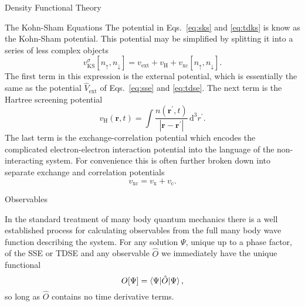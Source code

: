 \documentclass[letterpaper, 11 pt]{article}
\begin{document}
\begin{section}{Density Functional Theory \label{chap:dft}}
\begin{subsection}{The Kohn-Sham Equations \label{sec:ks}}
      The potential in Eqs.\ \eqref{eq:sks} and \eqref{eq:tdks} is know as the Kohn-Sham potential. This
      potential may be simplified by splitting it into a series of less complex objects
      \begin{equation} \label{eq:vks}
         v^\sigma_\mathrm{KS}[n_\uparrow, n_\downarrow] = v_\mathrm{ext} + v_\mathrm{H}
            + v_\mathrm{xc}[n_\uparrow, n_\downarrow].
      \end{equation}
      The first term in this expression is the external potential, which is essentially the same as the
      potential $\hat{V}_\mathrm{ext}$ of Eqs.\ \eqref{eq:sse} and \eqref{eq:tdse}. The next term is
      the Hartree screening potential
      \begin{equation} \label{eq:vh}
         v_\mathrm{H}(\mathbf{r},t) = \int \frac{n(\mathbf{r}^\prime, t)}
            {\left| \mathbf{r} - \mathbf{r}^\prime\right|} \, \mathrm{d}^3 r^\prime.
      \end{equation}
      The last term is the exchange-correlation potential which encodes the complicated
      electron-electron interaction potential into the language of the non-interacting system. For
      convenience this is often further broken down into separate exchange and correlation potentials
      \begin{equation} \label{eq:vxc}
         v_\mathrm{xc} = v_\mathrm{x} + v_\mathrm{c}.
      \end{equation}

   \end{subsection}

   \begin{subsection}{Observables \label{sec:obs}}

      In the standard treatment of many body quantum mechanics there is a well established process for
      calculating observables from the full many body wave function describing the system. For any
      solution $\Psi$, unique up to a phase factor, of the SSE or TDSE and any observable $\hat{O}$ we
      immediately have the unique functional
      \begin{equation} \label{eq:obsfunc1}
         O[\Psi] = \braket{\Psi| \hat{O} | \Psi},
      \end{equation}
      so long as $\hat{O}$ contains no time derivative terms.


\end{subsection}
\end{section}
\end{document}
